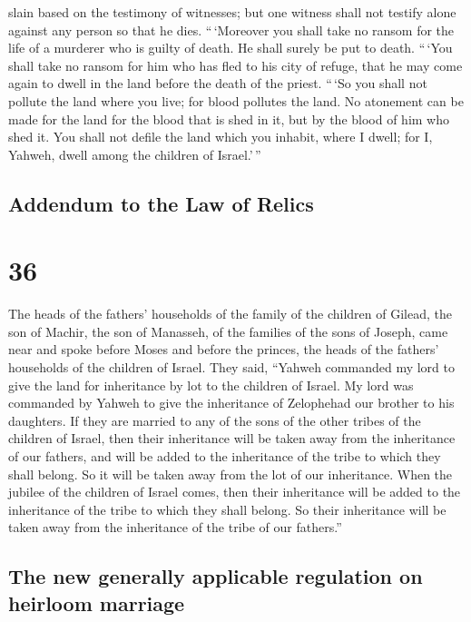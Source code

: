 slain based on the testimony of witnesses; but one witness shall not
testify alone against any person so that he dies. 
``\,`Moreover you shall take no ransom for the life of a murderer who is
guilty of death. He shall surely be put to death. 
``\,`You shall take no ransom for him who has fled to his city of
refuge, that he may come again to dwell in the land before the death of
the priest.  ``\,`So you shall not pollute the land where
you live; for blood pollutes the land. No atonement can be made for the
land for the blood that is shed in it, but by the blood of him who shed
it.  You shall not defile the land which you inhabit,
where I dwell; for I, Yahweh, dwell among the children of Israel.'\,''

\hypertarget{addendum-to-the-law-of-relics}{%
\subsection{Addendum to the Law of
Relics}\label{addendum-to-the-law-of-relics}}

\hypertarget{section-35}{%
\section{36}\label{section-35}}

 The heads of the fathers' households of the family of the
children of Gilead, the son of Machir, the son of Manasseh, of the
families of the sons of Joseph, came near and spoke before Moses and
before the princes, the heads of the fathers' households of the children
of Israel.  They said, ``Yahweh commanded my lord to give
the land for inheritance by lot to the children of Israel. My lord was
commanded by Yahweh to give the inheritance of Zelophehad our brother to
his daughters.  If they are married to any of the sons of
the other tribes of the children of Israel, then their inheritance will
be taken away from the inheritance of our fathers, and will be added to
the inheritance of the tribe to which they shall belong. So it will be
taken away from the lot of our inheritance.  When the
jubilee of the children of Israel comes, then their inheritance will be
added to the inheritance of the tribe to which they shall belong. So
their inheritance will be taken away from the inheritance of the tribe
of our fathers.''

\hypertarget{the-new-generally-applicable-regulation-on-heirloom-marriage}{%
\subsection{The new generally applicable regulation on heirloom
marriage}\label{the-new-generally-applicable-regulation-on-heirloom-marriage}}

